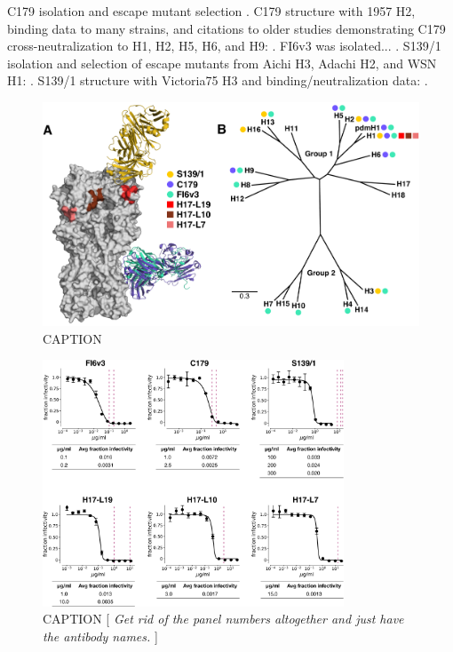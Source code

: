 \documentclass[11pt]{article}
\newcommand{\comment}[1]{{\color{red}[\textsl{#1}]}}
\begin{document}
C179 isolation and escape mutant selection \cite{okuno1993common}.
C179 structure with 1957 H2, binding data to many strains, and citations to older studies demonstrating C179 cross-neutralization to H1, H2, H5, H6, and H9:  \cite{dreyfus2013structure}.
FI6v3 was isolated... \cite{corti2011neutralizing}.
S139/1 isolation and selection of escape mutants from Aichi H3, Adachi H2, and WSN H1: \cite{yoshida2009cross}.
S139/1 structure with Victoria75 H3 and binding/neutralization data: \cite{lee2012heterosubtypic}.

\begin{figure}
\centerline{\includegraphics[width=\textwidth]{figs/antibody_summary_fig/Ab_summary.pdf}}
\caption{\label{fig:antibody_summary}
CAPTION
}
\end{figure}


\begin{figure}
\centerline{\includegraphics[width=0.8\textwidth]{figs/neutralization_curves/WT_neutralization_curves.pdf}}
\caption{\label{fig:neutcurves}
CAPTION
\comment{
Get rid of the panel numbers altogether and just have the antibody names.
}
}
\end{figure}
\end{document}
